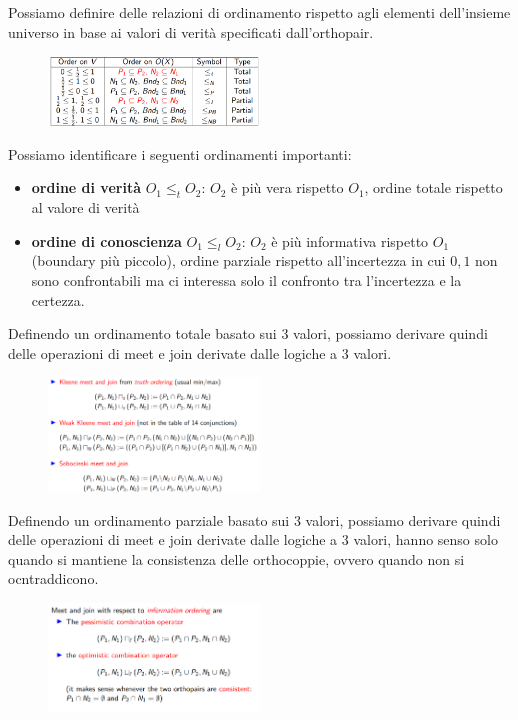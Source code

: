 Possiamo definire delle relazioni di ordinamento rispetto agli elementi dell'insieme 
universo in base ai valori di verità specificati dall'orthopair.

\begin{figure}[!h]
    \centering
    \includegraphics[width=0.5\textwidth]{img/sistemi_incerti/ordering.png}
\end{figure}

Possiamo identificare i seguenti ordinamenti importanti:
\begin{itemize}
    \item \textbf{ordine di verità} $O_1\le_t O_2$: $O_2$ è più vera rispetto $O_1$, ordine totale rispetto al valore di verità
    \item \textbf{ordine di conoscienza} $O_1\le_l O_2$: $O_2$ è più informativa rispetto $O_1$ (boundary più piccolo), ordine parziale rispetto all'incertezza
    in cui $0,1$ non sono confrontabili ma ci interessa solo il confronto tra l'incertezza
    e la certezza.
\end{itemize}

Definendo un ordinamento totale basato sui $3$ valori, possiamo derivare quindi delle operazioni 
di meet e join derivate dalle logiche a $3$ valori.

\begin{figure}[!h]
    \centering
    \includegraphics[width=0.5\textwidth]{img/sistemi_incerti/op_ortho.png}
\end{figure}


Definendo un ordinamento parziale basato sui $3$ valori, possiamo derivare quindi delle operazioni 
di meet e join derivate dalle logiche a $3$ valori, hanno senso solo quando si mantiene 
la consistenza delle orthocoppie, ovvero quando non si ocntraddicono.

\begin{figure}[!h]
    \centering
    \includegraphics[width=0.5\textwidth]{img/sistemi_incerti/op_orthon_r.png}
\end{figure}

